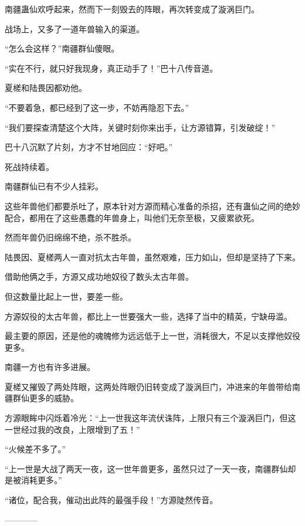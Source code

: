 \begin{this_body}
南疆蛊仙欢呼起来，然而下一刻毁去的阵眼，再次转变成了漩涡巨门。

战场上，又多了一道年兽输入的渠道。

“怎么会这样？”南疆群仙傻眼。

“实在不行，就只好我现身，真正动手了！”巴十八传音道。

夏槎和陆畏因都劝他。

“不要着急，都已经到了这一步，不妨再隐忍下去。”

“我们要探查清楚这个大阵，关键时刻你来出手，让方源错算，引发破绽！”

巴十八沉默了片刻，方才不甘地回应：“好吧。”

死战持续着。

南疆群仙已有不少人挂彩。

这些年兽他们都要杀吐了，原本针对方源而精心准备的杀招，还有蛊仙之间的绝妙配合，都用在了这些愚蠢的年兽身上，叫他们无奈至极，又疲累欲死。

然而年兽仍旧绵绵不绝，杀不胜杀。

陆畏因、夏槎两人一直对抗太古年兽，虽然艰难，压力如山，但却是坚持了下来。

借助他俩之手，方源又成功地奴役了数头太古年兽。

但这数量比起上一世，要差一些。

方源奴役的太古年兽，都比上一世要强大一些，选择了当中的精英，宁缺毋滥。

最主要的原因，还是他的魂魄修为远远低于上一世，消耗很大，不足以支撑他奴役更多。

南疆一方也有许多进展。

夏槎又摧毁了两处阵眼，这两处阵眼仍旧转变成了漩涡巨门，冲进来的年兽带给南疆群仙更多的威胁。

方源眼眸中闪烁着冷光：“上一世我这年流伏诛阵，上限只有三个漩涡巨门，但这一世经过我的改良，上限增到了五！”

“火候差不多了。”

“上一世是大战了两天一夜，这一世年兽更多，虽然只过了一天一夜，南疆群仙却是被消耗更多。”

“诸位，配合我，催动出此阵的最强手段！”方源陡然传音。

------------

\end{this_body}

